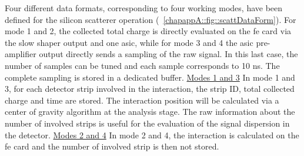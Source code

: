 Four different data formats, corresponding to four working modes, have been defined for the silicon scatterer operation (\figurename~\ref{chapappA::fig::scattDataForm}). For mode 1 and 2, the collected total charge is directly evaluated on the \gls{fe} card via the slow shaper output and one \gls{asic}, while for mode 3 and 4 the \gls{asic} pre-amplifier output directly sends a sampling of the raw signal.  In this last case, the number of samples can be tuned and each sample corresponds to 10 ns. The complete sampling is stored in a dedicated buffer.\newline\newline
\underline{Modes 1 and 3}\newline
In mode 1 and 3, for each detector strip involved in the interaction, the strip ID, total collected charge and time are stored. The interaction position will be calculated via a center of gravity algorithm at the analysis stage. The raw information about the number of involved strips is useful for the evaluation of the signal dispersion in the detector.\newline
\underline{Modes 2 and 4}\newline
In mode 2 and 4, the interaction is calculated on the \gls{fe} card and the number of involved strip is then not stored.\newline

